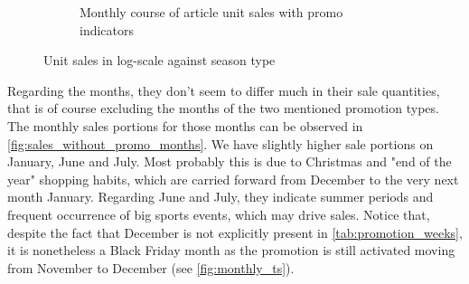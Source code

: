 \begin{figure}[H]
\begin{subfigure}{.45\textwidth}
  \caption{Monthly course of article unit sales with promo indicators}
  \label{fig:season_type_against_logsales}
\end{subfigure}
\caption{Unit sales in log-scale against season type}
\label{fig:log_sales_vs_markdown_and_season_type}
\end{figure}




Regarding the months, they don't seem to differ much in their sale quantities, that is of course excluding the months of the two mentioned promotion types. The monthly sales portions for those months can be observed in \autoref{fig:sales_without_promo_months}. We have slightly higher sale portions on January, June and July. 
Most probably this is due to Christmas and "end of the year" shopping habits, which are carried forward from December to the very next month January. 
Regarding June and July, they indicate summer periods and frequent occurrence of big sports events, which may drive sales. 
Notice that, despite the fact that December is not explicitly present in \autoref{tab:promotion_weeks}, it is nonetheless a Black Friday month as the promotion is still activated moving from November to December (see \autoref{fig:monthly_ts}). 
\\


